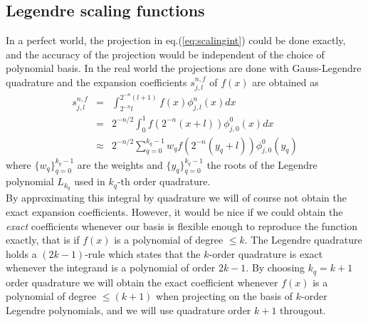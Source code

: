 \subsection*{Legendre scaling functions}
In a perfect world, the projection in eq.(\ref{eq:scalingint}) could be done 
exactly, and the accuracy of the projection 
would be independent of the choice of polynomial basis. In the real world the
projections are done with Gauss-Legendre quadrature and the expansion
coefficients $s_{j,l}^{n,f}$ of $f(x)$ are obtained as
\begin{eqnarray}
	\nonumber
	s_{j,l}^{n,f} &=& \int_{2^{-n}l}^{2^{-n}(l+1)} f(x)\phi_{j,l}^n(x)dx\\
	\nonumber
			&=& 2^{-n/2}\int_0^1 f(2^{-n}(x+l)) \phi_{j,0}^0(x)dx\\
	\label{eq:quadrature}
			&\approx& 2^{-n/2}\sum_{q=0}^{k_q-1} w_q f(2^{-n}(y_q+l)) 
			\phi_{j,0}^0(y_q)
\end{eqnarray}
where $\lbrace w_q\rbrace_{q=0}^{k_q-1}$ are the weights and
$\lbrace y_q\rbrace_{q=0}^{k_q-1}$ the roots of the Legendre
polynomial $L_{k_q}$ used in $k_q$-th order quadrature.\\

\noindent
By approximating this integral by quadrature we will of course not obtain the
exact expansion coefficients. However, it would be nice if we could obtain the
\emph{exact} coefficients whenever our basis is flexible enough to reproduce
the function exactly, that is if $f(x)$ is a polynomial of degree $\leq k$.
The Legendre quadrature holds a $(2k-1)$-rule which states that the $k$-order
quadrature is exact whenever the integrand is a polynomial of order $2k-1$.
By choosing $k_q = k+1$ order quadrature we will obtain the exact coefficient
whenever $f(x)$ is a polynomial of degree $\leq (k+1)$ when projecting on the
basis of $k$-order Legendre polynomials, and we will use quadrature order
$k+1$ througout.\\

